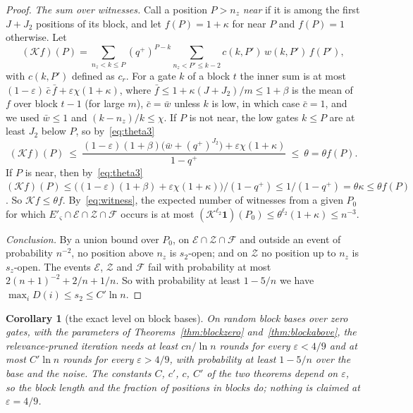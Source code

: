 \documentclass[11pt]{amsart}
\newtheorem{corollary}[theorem]{Corollary}
\theoremstyle{definition}
\theoremstyle{remark}
\newcommand{\eps}{\varepsilon}
\begin{document}
\begin{proof}
\emph{The sum over witnesses.} Call a position $P>n_z$ \emph{near} if it is among the first
$J+J_2$ positions of its block, and let $f(P)=1+\kappa$ for near $P$ and $f(P)=1$ otherwise. Let
\[
(\mathcal Kf)(P)=\sum_{n_z<k\le P}(q^+)^{P-k}\sum_{n_z<P'\le k-2}c(k,P')\,w(k,P')\,f(P'),
\]
with $c(k,P')$ defined as $c_r$. For a gate $k$ of a block $t$ the inner sum is at most
$(1-\eps)\,\bar c\,\bar f+\eps\chi(1+\kappa)$, where $\bar f\le1+\kappa(J+J_2)/m\le1+\beta$ is the
mean of $f$ over block $t-1$ (for large $m$), $\bar c=\bar w$ unless $k$ is low, in which case
$\bar c=1$, and we used $\bar w\le1$ and $(k-n_z)/k\le\chi$. If $P$ is
not near, the low gates $k\le P$ are at least $J_2$ below $P$, so by~\eqref{eq:theta3}
\[
(\mathcal Kf)(P)\ \le\ \frac{(1-\eps)(1+\beta)\bigl(\bar w+(q^+)^{J_2}\bigr)+\eps\chi(1+\kappa)}{1-q^+}\ \le\ \theta=\theta f(P).
\]
If $P$ is near, then by~\eqref{eq:theta3}
$(\mathcal Kf)(P)\le\bigl((1-\eps)(1+\beta)+\eps\chi(1+\kappa)\bigr)/(1-q^+)\le1/(1-q^+)=\theta\kappa\le\theta f(P)$.
So $\mathcal Kf\le\theta f$. By~\eqref{eq:witness}, the expected number of witnesses from a
given $P_0$ for which $E'_\varsigma\cap\mathcal E\cap\mathcal Z\cap\mathcal F$ occurs is at most
$(\mathcal K^{\ell_2}\mathbf 1)(P_0)\le\theta^{\ell_2}(1+\kappa)\le n^{-3}$.

\emph{Conclusion.} By a union bound over $P_0$, on $\mathcal E\cap\mathcal Z\cap\mathcal F$ and
outside an event of probability $n^{-2}$, no position above $n_z$ is $s_2$-open; and on
$\mathcal Z$ no position up to $n_z$ is $s_z$-open. The events $\mathcal E$, $\mathcal Z$ and
$\mathcal F$ fail with probability at most $2(n+1)^{-2}+2/n+1/n$. So with probability at least
$1-5/n$ we have $\max_iD(i)\le s_2\le C'\ln n$.
\end{proof}

\begin{corollary}[the exact level on block bases]\label{cor:exact}
On random block bases over zero gates, with the parameters of
Theorems~\ref{thm:blockzero} and~\ref{thm:blockabove}, the relevance-pruned iteration needs at
least $cn/\ln n$ rounds for every $\eps<4/9$ and at most $C'\ln n$ rounds for every $\eps>4/9$,
with probability at least $1-5/n$ over the base and the noise. The constants $C$, $c'$, $c$,
$C'$ of the two theorems depend on $\eps$, so the block length and the fraction of positions in
blocks do; nothing is claimed at $\eps=4/9$.
\end{corollary}
\end{document}
